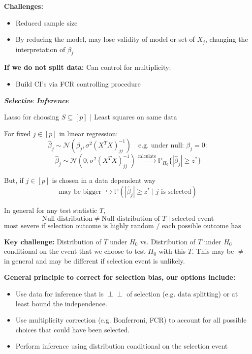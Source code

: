 \textbf{Challenges:}
\begin{itemize}
    \item Reduced sample size
    \item By reducing the model, may lose validity of model or set of $X_j$, changing the interpretation of $\beta_j$
\end{itemize}

\textbf{If we do not split data:} Can control for multiplicity:
\begin{itemize}
    \item Build CI's via FCR controlling procedure
\end{itemize}

\emph{\textbf{Selective Inference}}

Lasso for choosing $S \subseteq [p]$ | Least squares on same data

For fixed $j \in [p]$ in linear regression:
\[ \hat{\beta}_j \sim \mathcal{N}\left( \beta_j, \sigma^2(X^TX)^{-1}_{jj} \right) \quad \text{e.g. under null: } \beta_j = 0: \]
\[ \hat{\beta}_j \sim \mathcal{N}\left( 0, \sigma^2(X^TX)^{-1}_{jj} \right) \xrightarrow{\text{calculate}} \mathbb{P}_{H_0}\{ |\hat{\beta}_j| \ge z^* \} \]

But, if $j \in [p]$ is chosen in a data dependent way
\[ \text{may be bigger } \hookrightarrow \mathbb{P}( |\hat{\beta}_j| \ge z^* \mid j \text{ is selected} ) \]

In general for any test statistic $T$,
\[ \text{Null distribution} \neq \text{Null distribution of } T \mid \text{selected event} \]
\[ \text{most severe if selection outcome is highly random / each possible outcome has low prob.} \]

\textbf{Key challenge:} Distribution of $T$ under $H_0$ vs. Distribution of $T$ under $H_0$ conditional on the event that we choose to test $H_0$ with this $T$.
This may be $\neq$ in general and may be different if selection event is unlikely.

\textbf{General principle to correct for selection bias, our options include:}
\begin{itemize}
    \item Use data for inference that is $\perp\!\!\perp$ of selection (e.g. data splitting) or at least bound the independence.
    \item Use multiplicity correction (e.g. Bonferroni, FCR) to account for all possible choices that could have been selected.
    \item Perform inference using distribution conditional on the selection event
\end{itemize}

